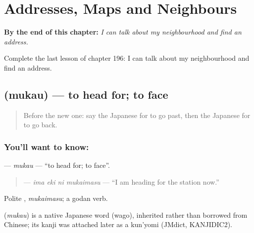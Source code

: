 
\chapter{Addresses, Maps and Neighbours}
\label{ch:ja-addresses-maps-and-neighbours}

\begin{chapteropening}
\textbf{By the end of this chapter:} \emph{I can talk about my neighbourhood and find an address.}

Complete the last lesson of chapter 196: I can talk about my neighbourhood and find an address.
\end{chapteropening}

\section[\texorpdfstring{\ja{むかう} (mukau)}{むかう (mukau)}]{ (mukau) — to head for; to face}

\label{lesson:JA-C196-mukau}



\begin{quote}
Before the new one: say the Japanese for to go past, then the Japanese for to go back.
\end{quote}

\subsection*{You'll want to know: }
\textbf{} — \emph{mukau} — \textquotedblleft{}to head for; to face\textquotedblright{}.

\begin{quote}
\textbf{  } — \emph{ima eki ni mukaimasu} — \textquotedblleft{}I am heading for the station now.\textquotedblright{}
\end{quote}

Polite \textbf{}, \emph{mukaimasu}; a godan verb.

\begin{cousinweb}
\textbf{} (\emph{mukau}) is a native Japanese word (wago), inherited rather than borrowed from Chinese; its kanji was attached later as a kun'yomi (JMdict, KANJIDIC2).
\end{cousinweb}

